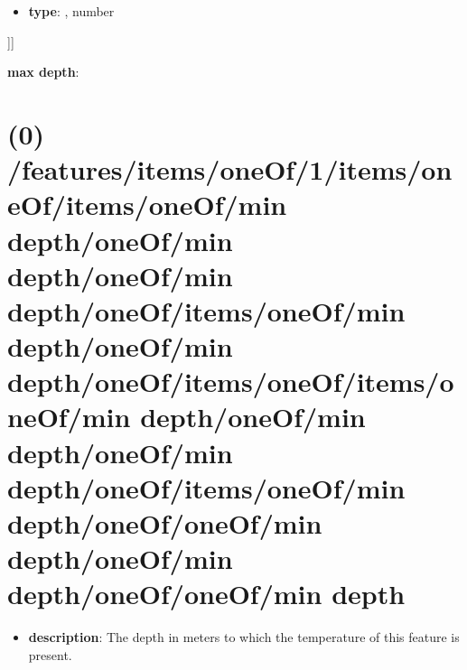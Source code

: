 \begin{itemize}[leftmargin=5em]\item {\bf type}: , number\end{itemize}]]\item {\bf max depth}: \section{(0) /features/items/oneOf/1/items/oneOf/items/oneOf/min depth/oneOf/min depth/oneOf/min depth/oneOf/items/oneOf/min depth/oneOf/min depth/oneOf/items/oneOf/items/oneOf/min depth/oneOf/min depth/oneOf/min depth/oneOf/items/oneOf/min depth/oneOf/oneOf/min depth/oneOf/min depth/oneOf/oneOf/min depth}
\begin{itemize}[leftmargin=0em]\item {\bf description}: The depth in meters to which the temperature of this feature is present.
\end{itemize}
